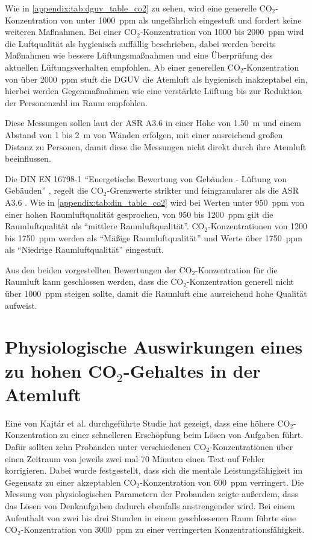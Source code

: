 \documentclass[a4paper,
    11pt,
    headings=small,
    ngerman,
    listof=totoc,
    numbers=noenddot]{scrreprt}[2021/11/13]
\begin{document}
Wie in \vref{appendix:tab:dguv_table_co2} zu sehen, wird eine generelle CO$_2$-Konzentration von unter \SI{1000}{\ac{ppm}} als ungefährlich eingestuft und fordert keine weiteren Maßnahmen. Bei einer CO$_2$-Konzentration von \si{1000} bis \SI{2000}{\ac{ppm}} wird die Luftqualität als hygienisch auffällig beschrieben, dabei werden bereits Maßnahmen wie bessere Lüftungsmaßnahmen und eine Überprüfung des aktuellen Lüftungsverhalten empfohlen. Ab einer generellen CO$_2$-Konzentration von über \SI{2000}{\ac{ppm}} stuft die \ac{DGUV} die Atemluft als hygienisch inakzeptabel ein, hierbei werden
Gegenmaßnahmen wie eine verstärkte Lüftung bis zur Reduktion der Personenzahl im Raum empfohlen.

Diese Messungen sollen laut der \ac{ASR} A3.6 \autocite{ASR} in einer Höhe von \SI{1.50}{\metre} und einem Abstand von \si{1} bis \SI{2}{\metre} von Wänden erfolgen, mit einer ausreichend großen Distanz zu Personen, damit diese die Messungen nicht direkt durch ihre Atemluft beeinflussen.

Die DIN EN 16798-1 \autocite{din_en_16798} \enquote{Energetische Bewertung von Gebäuden - Lüftung von Gebäuden} \autocite{din_en_16798}, regelt die CO$_2$-Grenzwerte strikter und feingranularer als die \ac{ASR} A3.6 \autocite{ASR}. Wie in \vref{appendix:tab:din_table_co2} wird bei Werten unter \SI{950}{\ac{ppm}} von einer hohen Raumluftqualität gesprochen, von \si{950} bis \SI{1200}{\ac{ppm}} gilt die Raumluftqualität als \enquote{mittlere Raumluftqualität}. CO$_2$-Konzentrationen von \si{1200} bis \SI{1750}{\ac{ppm}} werden als \enquote{Mäßige Raumluftqualität} und Werte über \SI{1750}{\ac{ppm}} als \enquote{Niedrige Raumluftqualität} eingestuft.

Aus den beiden vorgestellten Bewertungen der CO$_2$-Konzentration für die Raumluft kann geschlossen werden, dass die CO$_2$-Konzentration generell nicht über \SI{1000}{\ac{ppm}} steigen sollte, damit die Raumluft eine ausreichend hohe Qualität aufweist.


\section{Physiologische Auswirkungen eines zu hohen CO\texorpdfstring{$_2$}{TEXT}-Gehaltes in der Atemluft}

Eine von Kajtár et al. \autocite{kajtar} durchgeführte Studie hat gezeigt, dass eine höhere CO$_2$-Konzentration zu einer schnelleren Erschöpfung beim Lösen von Aufgaben führt. Dafür sollten zehn Probanden unter verschiedenen CO$_2$-Konzentrationen über einen Zeitraum von jeweils zwei mal 70 Minuten einen Text auf Fehler korrigieren. Dabei wurde festgestellt, dass sich die mentale Leistungsfähigkeit im Gegensatz zu einer akzeptablen CO$_2$-Konzentration von \SI{600}{\ac{ppm}} verringert. Die Messung von physiologischen Parametern der Probanden zeigte außerdem, dass das Lösen von Denkaufgaben dadurch ebenfalls anstrengender wird. Bei einem Aufenthalt von zwei bis drei Stunden in einem geschlossenen Raum führte eine CO$_2$-Konzentration von \SI{3000}{\ac{ppm}} zu einer verringerten Konzentrationsfähigkeit.
\end{document}
